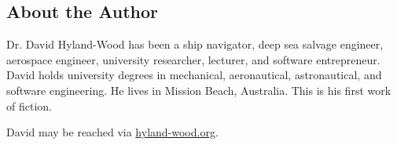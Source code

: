 % 
% 

\vspace*{\fill}
\begin{center}
\section*{\textbf{About the Author}}
\end{center}


Dr. David Hyland-Wood has been a ship navigator, deep sea salvage engineer, aerospace engineer, university researcher, lecturer, and software entrepreneur. David holds university degrees in mechanical, aeronautical, astronautical, and software engineering. He lives in Mission Beach, Australia. This is his first work of fiction.

David may be reached via \href{hyland-wood.org}{hyland-wood.org}.
\vspace*{\fill}
